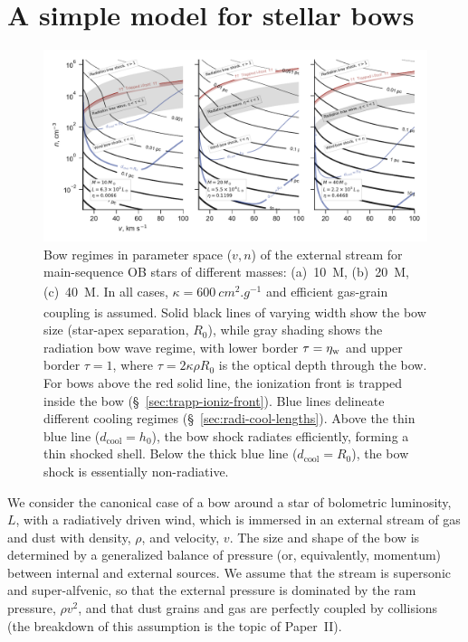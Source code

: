 \section{A simple model for stellar bows}
\label{sec:strong-gas-grain}

\begin{figure}
  \includegraphics[width=\linewidth]{figs/zones-v-n-plane}
  \caption{Bow regimes in parameter space (\(v, n\)) of the external
    stream for main-sequence OB stars of different masses:
    (a)~\SI{10}{M_\odot}, (b)~\SI{20}{M_\odot}, (c)~\SI{40}{M_\odot}.  In all
    cases, \(\kappa = \SI{600}{cm^2.g^{-1}}\) and efficient gas-grain
    coupling is assumed. Solid black lines of varying width show the
    bow size (star-apex separation, \(R_0\)), while gray shading shows
    the radiation bow wave regime, with lower border
    \(\tau = \eta_{\text{w}}\) and upper border \(\tau = 1\), where
    \(\tau = 2 \kappa \rho R_0\) is the optical depth through the bow.  For bows
    above the red solid line, the ionization front is trapped inside
    the bow (\S~\ref{sec:trapp-ioniz-front}).  Blue lines delineate
    different cooling regimes (\S~\ref{sec:radi-cool-lengths}).  Above
    the thin blue line (\(d_{\text{cool}} = h_0\)), the bow shock
    radiates efficiently, forming a thin shocked shell.  Below the
    thick blue line (\(d_{\text{cool}} = R_0\)), the bow shock is
    essentially non-radiative.}
  \label{fig:zones-v-n-plane}
\end{figure}


We consider the canonical case of a bow around a star of bolometric
luminosity, \(L\), with a radiatively driven wind, which is immersed
in an external stream of gas and dust with density, \(\rho\), and
velocity, \(v\).  The size and shape of the bow is determined by a
generalized balance of pressure (or, equivalently, momentum) between
internal and external sources.  We assume that the stream is
supersonic and super-alfvenic, so that the external pressure is
dominated by the ram pressure, \(\rho v^2\), and that dust grains and gas
are perfectly coupled by collisions (the breakdown of this assumption
is the topic of Paper~II).

